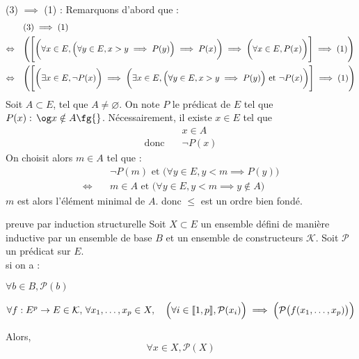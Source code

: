 \begin{demonstration}
    \item (3) $\implies$ (1) : Remarquons d'abord que : 
    \begin{align*}
        &\text{(3)} \implies \text{(1)} \\
        \Leftrightarrow  \quad &\Biggl(\Biggl[\biggl(\forall x \in E, \Bigl(\forall y \in E, x>y \implies P(y)\Bigr) \implies P(x)\biggr) \implies \biggl(\forall x \in E, P(x)\biggr) \Biggr] \implies \text{(1)} \Biggr)\\
        \Leftrightarrow \quad &\Biggl( \Biggl[\biggl(\exists x \in E, \lnot P(x)\biggr) \implies \biggl(\exists x \in E, \Bigl(\forall y \in E, x>y \implies P(y)\Bigr) \text{ et } \lnot P(x)\biggr)\Biggr] \implies \text{(1)}\Biggr)
    \end{align*}
    Soit $A \subset E$, tel que $A \neq \varnothing$. On note $P$ le prédicat de $E$ tel que $P(x) : \, \og x \notin A \fg{}$. Nécessairement, il existe $x \in E$ tel que \begin{align*}
        &x \in A \\
        \text{donc} \quad &\lnot P(x)
    \end{align*}
    On choisit alors $m \in A$ tel que : \begin{align*}
        &\lnot P(m) \text{ et } \bigl( \forall y \in E, y<m \implies P(y) \bigr)\\
        \Leftrightarrow \quad &m \in A \text{ et } \bigl( \forall y \in E, y<m \implies y \notin A \bigr)
    \end{align*}
    $m$ est alors l'élément minimal de $A$. donc $\leq$ est un ordre bien fondé.
\end{demonstration}

\begin{theoreme}{6.48}{preuve par induction structurelle}
    Soit $X \subset E$ un ensemble défini de manière inductive par un ensemble de base $B$ et un ensemble de constructeurs $\mathcal{K}$. Soit $\mathcal{P}$ un prédicat sur $E$. \\ si on a : \begin{enumeratebf}
        \item $\forall b \in B, \mathcal{P}(b)$
        \item $\forall f : E^p \rightarrow E \in \mathcal{K}, \, \forall x_1,\ldots, x_p \in X, \quad \Bigl(\forall i \in \llbracket 1,p \rrbracket, \mathcal{P}(x_i)\Bigr) \implies \Bigl(\mathcal{P}\bigl(f(x_1,\ldots,x_p)\bigr)\Bigr)$
    \end{enumeratebf}
    Alors, $$\forall x \in X, \mathcal{P}(X)$$
\end{theoreme}

